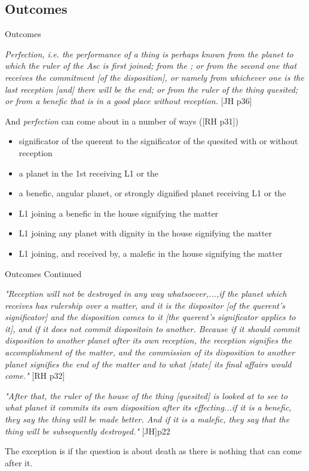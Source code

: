 \subsection{Outcomes}
\begin{frame}[t]{Outcomes}
\begin{block}{}
\textsl{Perfection, i.e. the performance of a thing is perhaps known from the planet to which the ruler of the Asc is first joined; from the \Moon; or from the second one that receives the commitment [of the disposition], or namely from whichever one is the last reception [and] there will be the end; or from the ruler of the thing quesited; or from a benefic that is in a good place without reception.} [JH p36]
\end{block}
And \textsl{perfection} can come about in a number of ways ([RH p31])
\begin{itemize}
\item significator of the querent to the significator of the quesited with or without reception
\item a planet in the 1st receiving L1 or the \Moon\
\item a benefic, angular planet, or strongly dignified planet receiving L1 or the \Moon\
\item L1 joining a benefic in the house signifying the matter
\item L1 joining any planet with dignity in the house signifying the matter
\item L1 joining, and received by, a malefic in the house signifying the matter
\end{itemize}
\end{frame}
\begin{frame}[t]{Outcomes Continued}
\begin{block}{}
\textsl{"Reception will not be destroyed in any way whatsoever,...,if the planet which receives has rulership over a matter, and it is the dispositor [of the querent's significator] and the disposition comes to it [the querent's significator applies to it], and if it does not commit dispositoin to another. Because if it should commit disposition to another planet after its own reception, the reception signifies the accomplishment of the matter, and the commission of its disposition to another planet signifies the end of the matter and to what [state] its final affairs would come."} [RH p32]
\end{block}

\begin{block}{}
\textsl{"After that, the ruler of the house of the thing [quesited] is looked at to see to what planet it commits its own disposition after its effecting...if it is a benefic, they say the thing will be made better. And if it is a malefic, they say that the thing will be subsequently destroyed."} [JH]p22
\end{block}

The exception is if the question is about death as there is nothing that can come after it.
\end{frame}